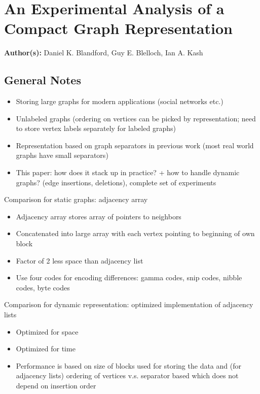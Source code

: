 \section{An Experimental Analysis of a Compact Graph Representation}

\textbf{Author(s):} Daniel K. Blandford, Guy E. Blelloch, Ian A. Kash

\subsection{General Notes}
\begin{itemize}
    \item Storing large graphs for modern applications (social networks etc.)
    \item Unlabeled graphs (ordering on vertices can be picked by representation; need to store vertex labels separately for labeled graphs)
    \item Representation based on graph separators in previous work (most real world graphs have small separators)
    \item This paper: how does it stack up in practice? + how to handle dynamic graphs? (edge insertions, deletions), complete set of experiments
\end{itemize}

Comparison for static graphs: adjacency array
\begin{itemize}
    \item Adjacency array stores array of pointers to neighbors
    \item Concatenated into large array with each vertex pointing to beginning of own block
    \item Factor of 2 less space than adjacency list
    \item Use four codes for encoding differences: gamma codes, snip codes, nibble codes, byte codes
\end{itemize}

Comparison for dynamic representation: optimized implementation of adjacency lists
\begin{itemize}
    \item Optimized for space
    \item Optimized for time
    \item Performance is based on size of blocks used for storing the data and (for adjacency lists) ordering of vertices v.s. separator based which does not depend on insertion order
\end{itemize}

